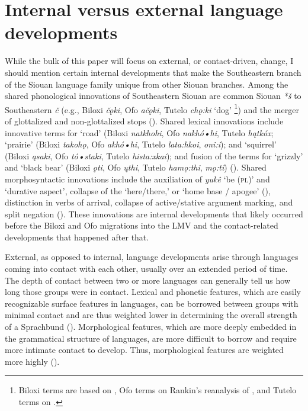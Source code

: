 \documentclass[output=paper]{LSP/langsci}
\begin{document}
\section{Internal versus external language developments}

While the bulk of this paper will focus on external, or contact-driven, change, I should mention certain internal developments that make the Southeastern branch of the Siouan language family unique from other Siouan branches. Among the shared phonological innovations of Southeastern Siouan are common Siouan \emph{*š} to Southeastern \emph{č} (e.g., Biloxi \emph{čǫki}, Ofo \emph{ačǫki}, Tutelo \emph{chǫ:ki} `dog' \footnote{Biloxi terms are based on \citet{DorseySwanton1912}, Ofo terms on Rankin’s reanalysis \citeyearpar{Rankin2002} of \citet{DorseySwanton1912}, and Tutelo terms on \citet{Oliverio1996}.}) and the merger of glottalized and non-glottalized stops (\citealt{Rankin2011}). Shared lexical innovations include innovative terms for `road' (Biloxi \emph{natkhohi}, Ofo \emph{nakhó•hi}, Tutelo \emph{hątkóx}; `prairie' (Biloxi \emph{takohǫ}, Ofo \emph{akhó•hi}, Tutelo \emph{lata:hkoi}, \emph{oni:i}); and `squirrel' (Biloxi \emph{ąsaki}, Ofo \emph{tó•staki}, Tutelo \emph{hista:xkai}); and fusion of the terms for `grizzly' and `black bear' (Biloxi \emph{ǫti}, Ofo \emph{ųthi}, Tutelo \emph{hamǫ:thi}, \emph{mǫ:ti}) (\citealt{Rankin2011}). Shared morphosyntactic innovations include the auxiliation of \emph{yukê} `be (\textsc{pl})' and `durative aspect', collapse of the `here/there,' or `home base / apogee' (\citealt[125]{Cumberland2005}), distinction in verbs of arrival, collapse of active/stative argument marking, and split negation (\citealt{Cumberland2005}). These innovations are internal developments that likely occurred before the Biloxi and Ofo migrations into the LMV and the contact-related developments that happened after that.

External, as opposed to internal, language developments arise through languages coming into contact with each other, usually over an extended period of time. The depth of contact between two or more languages can generally tell us how long those groups were in contact. Lexical and phonetic features, which are easily recognizable surface features in languages, can be borrowed between groups with minimal contact and are thus weighted lower in determining the overall strength of a Sprachbund (\citealt{Kaufman2014}). Morphological features, which are more deeply embedded in the grammatical structure of languages, are more difficult to borrow and require more intimate contact to develop. Thus, morphological features are weighted more highly (\citealt{Kaufman2014}).
\end{document}
